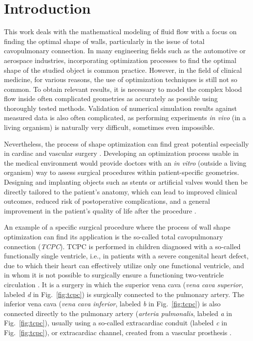 \chapter*{Introduction}


This work deals with the mathematical modeling of fluid flow with a focus on finding the optimal shape of walls, particularly in the issue of total cavopulmonary connection. In many engineering fields such as the automotive or aerospace industries, incorporating optimization processes to find the optimal shape of the studied object is common practice. However, in the field of clinical medicine, for various reasons, the use of optimization techniques is still not so common. To obtain relevant results, it is necessary to model the complex blood flow inside often complicated geometries as accurately as possible using thoroughly tested methods. Validation of numerical simulation results against measured data is also often complicated, as performing experiments \textit{in vivo} (in a living organism) is naturally very difficult, sometimes even impossible.

Nevertheless, the process of shape optimization can find great potential especially in cardiac and vascular surgery \cite{Abraham2005, Weddell2015, Marsden2008}. Developing an optimization process usable in the medical environment would provide doctors with an \textit{in vitro} (outside a living organism) way to assess surgical procedures within patient-specific geometries. Designing and implanting objects such as stents or artificial valves would then be directly tailored to the patient's anatomy, which can lead to improved clinical outcomes, reduced risk of postoperative complications, and a general improvement in the patient's quality of life after the procedure \cite{Marsden2008}.

An example of a specific surgical procedure where the process of wall shape optimization can find its application is the so-called total cavopulmonary connection (\textit{TCPC}). TCPC is performed in children diagnosed with a so-called functionally single ventricle, i.e., in patients with a severe congenital heart defect, due to which their heart can effectively utilize only one functional ventricle, and in whom it is not possible to surgically ensure a functioning two-ventricle circulation \cite{Chaloup}. It is a surgery in which the superior vena cava (\textit{vena cava superior}, labeled \textit{d} in Fig.~\ref{fig:tcpc}) is surgically connected to the pulmonary artery. The inferior vena cava (\textit{vena cava inferior}, labeled \textit{b} in Fig.~\ref{fig:tcpc}) is also connected directly to the pulmonary artery (\textit{arteria pulmonalis}, labeled \textit{a} in Fig.~\ref{fig:tcpc}), usually using a so-called extracardiac conduit (labeled \textit{c} in Fig.~\ref{fig:tcpc}), or extracardiac channel, created from a vascular prosthesis \cite{Rubtsova, Delorme}.

